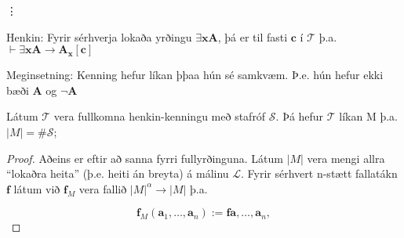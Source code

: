 \documentclass[12pt]{article}
\begin{document}
\vdots


\begin{ath}
  Henkin: Fyrir sérhverja lokaða yrðingu \( \exists \mathbf{x}\mathbf{A}\), þá
  er til fasti \(\mathbf{c}\) í $\mathcal{T}$ þ.a. $\vdash  \exists \mathbf{x}\mathbf{A} \rightarrow  \mathbf{A}_{\mathbf{x}}[\mathbf{c}]$

  Meginsetning:
  Kenning hefur líkan þþaa hún sé samkvæm.
  Þ.e. hún hefur ekki bæði $\mathbf{A}$ og $\lnot \mathbf{A}$
\end{ath}


\begin{setn}
  Látum $\mathcal{T}$ vera fullkomna henkin-kenningu
  með stafróf $\mathcal{S}$. Þá hefur $\mathcal{T}$ líkan M
  þ.a. $|M| = \#\mathcal{S}$;

  \begin{proof}
    Aðeins er eftir að sanna fyrri fullyrðinguna.
    Látum $|M|$ vera mengi allra ``lokaðra heita'' (þ.e. heiti án breyta) á málinu
    $\mathcal{L}$. Fyrir sérhvert n-stætt fallatákn $\mathbf{f}$
    látum við $\mathbf{f}_M$ vera fallið $|M|^{\alpha} \rightarrow |M|$
    þ.a.

    \[\mathbf{f}_M ( \mathbf{a}_1, \dotsc,\mathbf{a}_n ) := \mathbf{f} \mathbf{a}, \dotsc, \mathbf{a}_n ,\]
    

\end{proof}
\end{setn}
\end{document}
